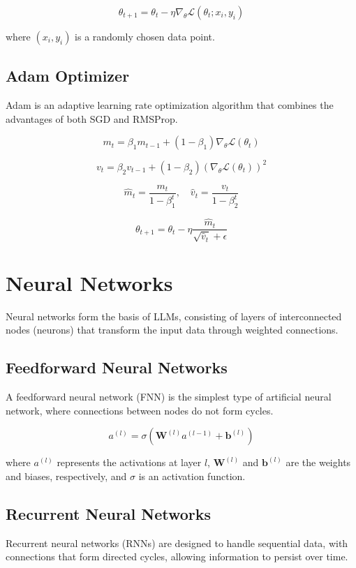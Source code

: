 \begin{equation}
\theta_{t+1} = \theta_t - \eta \nabla_\theta \mathcal{L}(\theta_t; x_i, y_i)
\end{equation}

where \( (x_i, y_i) \) is a randomly chosen data point.

\subsection{Adam Optimizer}
Adam is an adaptive learning rate optimization algorithm that combines the advantages of both SGD and RMSProp.

\begin{equation}
m_t = \beta_1 m_{t-1} + (1 - \beta_1) \nabla_\theta \mathcal{L}(\theta_t)
\end{equation}

\begin{equation}
v_t = \beta_2 v_{t-1} + (1 - \beta_2) (\nabla_\theta \mathcal{L}(\theta_t))^2
\end{equation}

\begin{equation}
\hat{m}_t = \frac{m_t}{1 - \beta_1^t}, \quad \hat{v}_t = \frac{v_t}{1 - \beta_2^t}
\end{equation}

\begin{equation}
\theta_{t+1} = \theta_t - \eta \frac{\hat{m}_t}{\sqrt{\hat{v}_t} + \epsilon}
\end{equation}

\section{Neural Networks}
Neural networks form the basis of LLMs, consisting of layers of interconnected nodes (neurons) that transform the input data through weighted connections.

\subsection{Feedforward Neural Networks}
A feedforward neural network (FNN) is the simplest type of artificial neural network, where connections between nodes do not form cycles.

\begin{equation}
a^{(l)} = \sigma(\mathbf{W}^{(l)} a^{(l-1)} + \mathbf{b}^{(l)})
\end{equation}

where \( a^{(l)} \) represents the activations at layer \( l \), \( \mathbf{W}^{(l)} \) and \( \mathbf{b}^{(l)} \) are the weights and biases, respectively, and \( \sigma \) is an activation function.

\subsection{Recurrent Neural Networks}
Recurrent neural networks (RNNs) are designed to handle sequential data, with connections that form directed cycles, allowing information to persist over time.